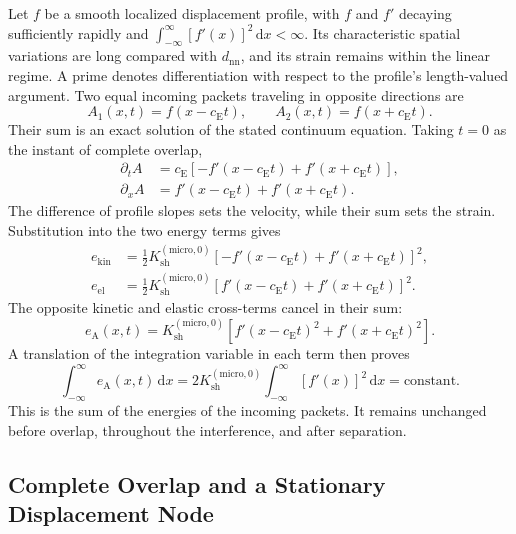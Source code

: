 Let $f$ be a smooth localized displacement profile, with $f$ and $f'$ decaying sufficiently rapidly and $\int_{-\infty}^{\infty}[f'(x)]^2\,\mathrm dx<\infty$. Its characteristic spatial variations are long compared with $d_{\mathrm{nn}}$, and its strain remains within the linear regime. A prime denotes differentiation with respect to the profile's length-valued argument. Two equal incoming packets traveling in opposite directions are
\begin{equation}
    A_1(x,t)=f(x-c_{\mathrm E}t),
    \qquad
    A_2(x,t)=f(x+c_{\mathrm E}t).
\end{equation}
Their sum is an exact solution of the stated continuum equation. Taking $t=0$ as the instant of complete overlap,
\begin{align}
    \partial_tA
    &=c_{\mathrm E}\left[
    -f'(x-c_{\mathrm E}t)+f'(x+c_{\mathrm E}t)\right],
    \\
    \partial_xA
    &=f'(x-c_{\mathrm E}t)+f'(x+c_{\mathrm E}t).
\end{align}
The difference of profile slopes sets the velocity, while their sum sets the strain. Substitution into the two energy terms gives
\begin{align}
    e_{\mathrm{kin}}
    &=\frac12K_{\mathrm{sh}}^{(\mathrm{micro},0)}
    \left[-f'(x-c_{\mathrm E}t)+f'(x+c_{\mathrm E}t)\right]^2,
    \\
    e_{\mathrm{el}}
    &=\frac12K_{\mathrm{sh}}^{(\mathrm{micro},0)}
    \left[f'(x-c_{\mathrm E}t)+f'(x+c_{\mathrm E}t)\right]^2.
\end{align}
The opposite kinetic and elastic cross-terms cancel in their sum:
\begin{equation}
    \boxed{
    e_{\mathrm A}(x,t)
    =K_{\mathrm{sh}}^{(\mathrm{micro},0)}
    \left[f'(x-c_{\mathrm E}t)^2+f'(x+c_{\mathrm E}t)^2\right]
    }.
\end{equation}
A translation of the integration variable in each term then proves
\begin{equation}
    \boxed{
    \int_{-\infty}^{\infty}e_{\mathrm A}(x,t)\,\mathrm dx
    =2K_{\mathrm{sh}}^{(\mathrm{micro},0)}
    \int_{-\infty}^{\infty}[f'(x)]^2\,\mathrm dx
    =\text{constant}
    }.
\end{equation}
This is the sum of the energies of the incoming packets. It remains unchanged before overlap, throughout the interference, and after separation.

\subsection{Complete Overlap and a Stationary Displacement Node}

